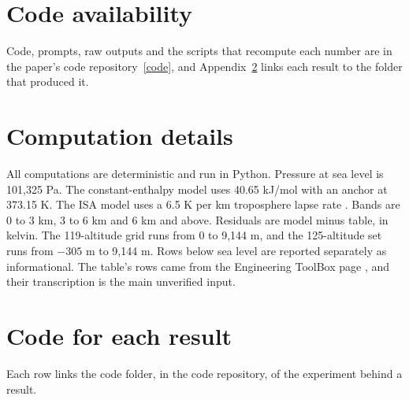 \documentclass[11pt,letterpaper]{article}
\begin{document}
\section*{Code availability}

Code, prompts, raw outputs and the scripts that recompute each number are in the paper's code repository~\href{https://github.com/ai-inventor-papers/ai-invention-fde7b3-simple-barometric-model-vs-boiling-point/tree/main}{[code]}, and Appendix~\ref{app:code} links each result to the folder that produced it.




\clearpage
\appendix

\section{Computation details}\label{app:details}

All computations are deterministic and run in Python. Pressure at sea level is 101,325 Pa. The constant-enthalpy model uses 40.65 kJ/mol with an anchor at 373.15 K. The ISA model uses a 6.5 K per km troposphere lapse rate \cite{ICAO1993}. Bands are 0 to 3 km, 3 to 6 km and 6 km and above. Residuals are model minus table, in kelvin. The 119-altitude grid runs from 0 to 9,144 m, and the 125-altitude set runs from $-305$ m to 9,144 m. Rows below sea level are reported separately as informational. The table's rows came from the Engineering ToolBox page \cite{EngineeringToolBox}, and their transcription is the main unverified input.

\section{Code for each result}\label{app:code}

Each row links the code folder, in the code repository, of the experiment behind a result.
\end{document}
